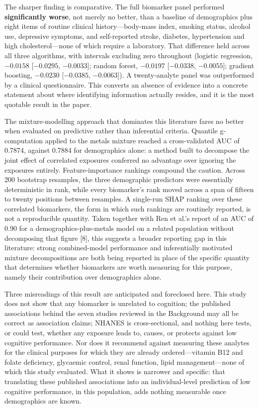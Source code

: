 \documentclass[12pt]{article}
\begin{document}
The sharper finding is comparative. The full biomarker panel performed \textbf{significantly worse}, not merely no better, than a baseline of demographics plus eight items of routine clinical history---body-mass index, smoking status, alcohol use, depressive symptoms, and self-reported stroke, diabetes, hypertension and high cholesterol---none of which require a laboratory. That difference held across all three algorithms, with intervals excluding zero throughout (logistic regression, $-0.0158$ [$-0.0295$, $-0.0033$]; random forest, $-0.0197$ [$-0.0338$, $-0.0055$]; gradient boosting, $-0.0230$ [$-0.0385$, $-0.0063$]). A twenty-analyte panel was outperformed by a clinical questionnaire. This converts an absence of evidence into a concrete statement about where identifying information actually resides, and it is the most quotable result in the paper.

The mixture-modelling approach that dominates this literature fares no better when evaluated on predictive rather than inferential criteria. Quantile g-computation applied to the metals mixture reached a cross-validated AUC of 0.7874, against 0.7884 for demographics alone: a method built to decompose the joint effect of correlated exposures conferred no advantage over ignoring the exposures entirely. Feature-importance rankings compound the caution. Across 200 bootstrap resamples, the three demographic predictors were essentially deterministic in rank, while every biomarker's rank moved across a span of fifteen to twenty positions between resamples. A single-run SHAP ranking over these correlated biomarkers, the form in which such rankings are routinely reported, is not a reproducible quantity. Taken together with Ren et al.'s report of an AUC of 0.90 for a demographics-plus-metals model on a related population without decomposing that figure [8], this suggests a broader reporting gap in this literature: strong combined-model performance and inferentially motivated mixture decompositions are both being reported in place of the specific quantity that determines whether biomarkers are worth measuring for this purpose, namely their contribution over demographics alone.

Three misreadings of this result are anticipated and foreclosed here. This study does not show that any biomarker is unrelated to cognition; the published associations behind the seven studies reviewed in the Background may all be correct as association claims; NHANES is cross-sectional, and nothing here tests, or could test, whether any exposure leads to, causes, or protects against low cognitive performance. Nor does it recommend against measuring these analytes for the clinical purposes for which they are already ordered---vitamin B12 and folate deficiency, glycaemic control, renal function, lipid management---none of which this study evaluated. What it shows is narrower and specific: that translating these published associations into an individual-level prediction of low cognitive performance, in this population, adds nothing measurable once demographics are known.
\end{document}
